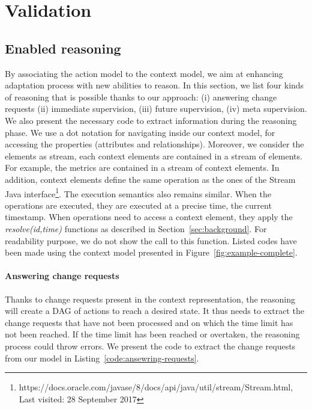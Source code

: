 \section{Validation}
\label{sec:tkm:validation}

\subsection{Enabled reasoning} 

By associating the action model to the context model, we aim at enhancing adaptation process with new abilities to reason.
In this section, we list four kinds of reasoning that is possible thanks to our approach: (i) answering change requests (ii) immediate supervision, (iii) future supervision, (iv) meta supervision.
We also present the necessary code to extract information during the reasoning phase.
We use a dot notation for navigating inside our context model, \ie for accessing the properties (attributes and relationships).
Moreover, we consider the elements as stream, \ie each context elements are contained in a stream of elements.
For example, the metrics are contained in a stream of context elements. 
In addition, context elements define the same operation as the ones of the Stream Java interface\footnote{https://docs.oracle.com/javase/8/docs/api/java/util/stream/Stream.html, Last visited: 28 September 2017}.
The execution semantics also remains similar.
When the operations are executed, they are executed at a precise time, \ie the current timestamp.
When operations need to access a context element, they apply the \textit{resolve(id,time)} functions as described in Section~\ref{sec:background}.
For readability purpose, we do not show the call to this function.
Listed codes have been made using the context model presented in Figure~\ref{fig:example-complete}.


\paragraph{Answering change requests}
Thanks to change requests present in the context representation, the reasoning will create a DAG of actions to reach a desired state.
It thus needs to extract the change requests that have not been processed and on which the time limit has not been reached. 
If the time limit has been reached or overtaken, the reasoning process could throw errors.
We present the code to extract the change requests from our model in Listing~\ref{code:ansewring-requests}.


